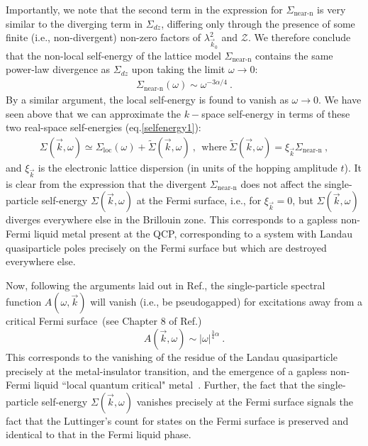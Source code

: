\documentclass[reprint,hidelinks]{revtex4-2}
\begin{document}
Importantly, we note that the second term in the expression for \(\Sigma_\text{near-n}\) is very similar to the diverging term in \(\Sigma_{dz}\), differing only through the presence of some finite (i.e., non-divergent) non-zero factors of \(\lambda_{\vec k_0}^2\) and \(\mathcal{Z}\). We therefore conclude that the non-local self-energy of the lattice model $\Sigma_\text{near-n}$ contains the same power-law divergence  as $\Sigma_{dz}$ upon taking the limit $\omega\to 0$:
\begin{equation}\begin{aligned}
	\Sigma_\text{near-n}\left( \omega \right) \sim \omega^{-3\alpha/4}~.
\end{aligned}\end{equation}
By a similar argument, the local self-energy is found to vanish as \(\omega \to 0\). We have seen above that we can approximate the \(k-\)space self-energy in terms of these two real-space self-energies (eq.\eqref{selfenergy1}):
\begin{equation}\begin{aligned}
	\Sigma(\vec k, \omega) \simeq \Sigma_\text{loc}(\omega) + \tilde{\Sigma}(\vec k, \omega)~,~~\textrm{where}~\tilde{\Sigma}(\vec k, \omega)=\xi_{\vec k}\Sigma_\text{near-n}~,
\end{aligned}\end{equation}
and $\xi_{\vec{k}}$ is the electronic lattice dispersion (in units of the hopping amplitude $t$). It is clear from the expression that the divergent $\Sigma_\text{near-n}$ does not affect the single-particle self-energy $\Sigma(\vec k,\omega)$ at the Fermi surface, i.e., for $\xi_{\vec{k}}= 0$, but $\Sigma(\vec k,\omega)$ diverges everywhere else in the Brillouin zone. This corresponds to a gapless non-Fermi liquid metal present at the QCP, corresponding to a system with Landau quasiparticle poles precisely on the Fermi surface but which are destroyed everywhere else.

Now, following the arguments laid out in Ref.\cite{sujan2023}, the single-particle spectral function $A(\omega,\vec{k})$ will vanish (i.e., be pseudogapped) for excitations away from a critical Fermi surface~(see Chapter 8 of Ref.\cite{carr2010})
\begin{equation}
A(\vec{k},\omega) \sim |\omega|^{\frac{3}{4}\alpha}~.
\end{equation}	
This corresponds to the vanishing of the residue of the Landau quasiparticle precisely at the metal-insulator transition, and the emergence of a gapless non-Fermi liquid ``local quantum critical" metal~\cite{Si2001}. Further, the fact that the single-particle self-energy $\Sigma(\vec k, \omega)$ vanishes precisely at the Fermi surface signals the fact that the Luttinger's count for states on the Fermi surface is preserved and identical to that in the Fermi liquid phase. 
\end{document}
